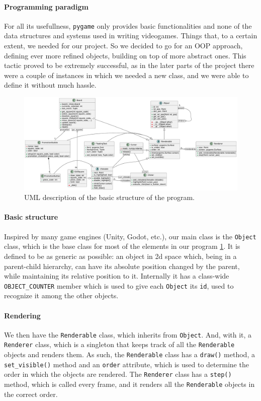 \documentclass[a4paper, 11pt, twocolumn]{IEEEtran}
\begin{document}
    \paragraph*{Programming paradigm} For all its usefullness, \texttt{pygame} only provides basic functionalities and none of the data structures and systems used in writing videogames. Things that, to a certain extent, we needed for our project. So we decided to go for an OOP approach, defining ever more refined objects, building on top of more abstract ones. This tactic proved to be extremely successful, as in the later parts of the project there were a couple of instances in which we needed a new class, and we were able to define it without much hassle.
    \begin{figure}
        \centering
        \includegraphics[width=.8\textwidth]{images/uml.pdf}
        \caption{UML description of the basic structure of the program.}
        \label{fig:uml}
    \end{figure}
    \paragraph*{Basic structure} Inspired by many game engines (Unity, Godot, etc.), our main class is the \texttt{Object} class, which is the base class for most of the elements in our program \ref{fig:uml}. It is defined to be as generic as possible: an object in 2d space which, being in a parent-child hierarchy, can have its absolute position changed by the parent, while maintaining its relative position to it. Internally it has a class-wide \texttt{OBJECT\_COUNTER} member which is used to give each \texttt{Object} its \texttt{id}, used to recognize it among the other objects.
    \paragraph*{Rendering} We then have the \texttt{Renderable} class, which inherits from \texttt{Object}. And, with it, a \texttt{Renderer} class, which is a singleton that keeps track of all the \texttt{Renderable} objects and renders them. As such, the \texttt{Renderable} class has a \texttt{draw()} method, a \texttt{set\_visible()} method and an \texttt{order} attribute, which is used to determine the order in which the objects are rendered. The \texttt{Renderer} class has a \texttt{step()} method, which is called every frame, and it renders all the \texttt{Renderable} objects in the correct order.
\end{document}
